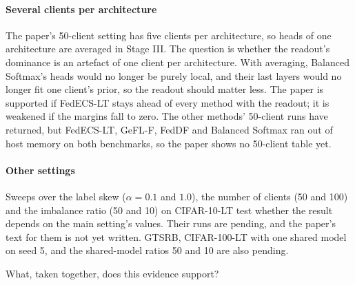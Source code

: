 \paragraph{Several clients per architecture} The paper's 50-client setting has five clients per architecture, so heads
of one architecture are averaged in Stage III. The question is whether the readout's dominance is an artefact of one
client per architecture. With averaging, Balanced Softmax's heads would no longer be purely local, and their last
layers would no longer fit one client's prior, so the readout should matter less. The paper is supported if FedECS-LT
stays ahead of every method with the readout; it is weakened if the margins fall to zero. The other methods' 50-client
runs have returned, but FedECS-LT, GeFL-F, FedDF and Balanced Softmax ran out of host memory on both benchmarks, so the
paper shows no 50-client table yet.

\paragraph{Other settings} Sweeps over the label skew ($\alpha=0.1$ and $1.0$), the number of clients (50 and 100)
and the imbalance ratio (50 and 10) on CIFAR-10-LT test whether the result depends on the main setting's values. Their
runs are pending, and the paper's text for them is not yet written. GTSRB, CIFAR-100-LT with one shared model on seed 5,
and the shared-model ratios 50 and 10 are also pending.

What, taken together, does this evidence support?
